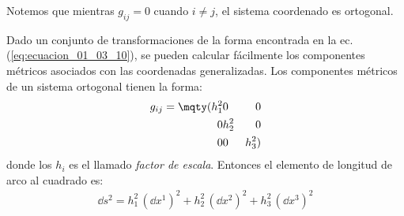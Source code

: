 Notemos que mientras $g_{ij} = 0$ cuando $i \neq j$, el sistema coordenado es ortogonal.

\par
Dado un conjunto de transformaciones de la forma encontrada en la ec. (\ref{eq:ecuacion_01_03_10}), se pueden calcular fácilmente los componentes métricos asociados con las coordenadas generalizadas. Los componentes métricos de un sistema ortogonal tienen la forma:
\begin{align*}
g_{ij} = \mqty(
h_{1}^{2} & 0 & 0 \\
0 & h_{2}^{2} & 0 \\
0 & 0 & h_{3}^{2})
\end{align*}
donde los $h_{i}$ es el llamado \emph{factor de escala}. Entonces el elemento de longitud de arco al cuadrado es:
\begin{align*}
\dd{s}^{2} = h_{1}^{2} \, (\dd{x}^{1})^{2} + h_{2}^{2} \, (\dd{x}^{2})^{2} + h_{3}^{2} \, (\dd{x}^{3})^{2}
\end{align*}

